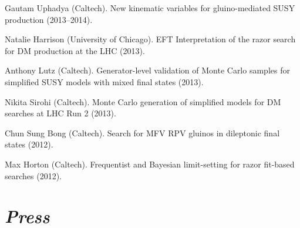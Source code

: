 \documentclass[11pt]{res}
\newcommand{\MarginText}[1]{\section{\textit{#1}}}
\begin{document}
\begin{resume}
\begin{itemize}
{    \item Gautam Uphadya (Caltech). New kinematic variables for gluino-mediated SUSY production ({2013--2014}).
    \item Natalie Harrison (University of Chicago). EFT Interpretation of the razor search for DM production at the LHC ({2013}).
    \item Anthony Lutz (Caltech). Generator-level validation of Monte Carlo samples for simplified SUSY models with mixed final states ({2013}).
    \item Nikita Sirohi (Caltech). Monte Carlo generation of simplified models for DM searches at LHC Run 2 ({2013}).
    \item Chun Sung Bong (Caltech). Search for MFV RPV gluinos in dileptonic final states ({2012}).
    \item Max Horton (Caltech). Frequentist and Bayesian limit-setting for razor fit-based searches ({2012}).
          }{}
  \end{itemize}

  \MarginText{Press}


\end{resume}
\end{document}
